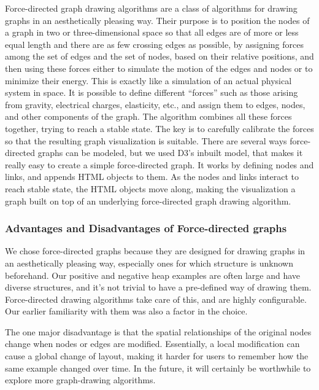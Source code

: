 Force-directed graph drawing algorithms \cite{eades84, fruchterman91} are a class of
algorithms for drawing graphs in an aesthetically pleasing way. Their purpose is to
position the nodes of a graph in two or three-dimensional space so that all edges are of
more or less equal length and there are as few crossing edges as possible, by assigning
forces among the set of edges and the set of nodes, based on their relative positions,
and then using these forces either to simulate the motion of the edges and nodes or to
minimize their energy. This is exactly like a simulation of an actual physical system in
space. It is possible to define different ``forces'' such as those arising from gravity,
electrical charges, elasticity, etc., and assign them to edges, nodes, and other
components of the graph. The algorithm combines all these forces together, trying to
reach a stable state. The key is to carefully calibrate the forces so that the resulting
graph visualization is suitable. There are several ways force-directed graphs can be
modeled, but we used D3's inbuilt model, that makes it really easy to create a simple
force-directed graph. It works by defining nodes and links, and appends HTML objects to
them. As the nodes and links interact to reach stable state, the HTML objects move
along, making the visualization a graph built on top of an underlying force-directed
graph drawing algorithm.

\subsubsection{Advantages and Disadvantages of Force-directed graphs}
\label{sec:advantages-disadvantages-force-directed-graphs}
We chose force-directed graphs because they are designed for drawing graphs in an
aesthetically pleasing way, especially ones for which structure is unknown beforehand.
Our positive and negative heap examples are often large and have diverse structures, and
it's not trivial to have a pre-defined way of drawing them. Force-directed drawing
algorithms take care of this, and are highly configurable. Our earlier familiarity with
them was also a factor in the choice.

The one major disadvantage is that the spatial relationships of the original nodes
change when nodes or edges are modified. Essentially, a local modification can cause a
global change of layout, making it harder for users to remember how the same example
changed over time. In the future, it will certainly be worthwhile to explore more
graph-drawing algorithms.

